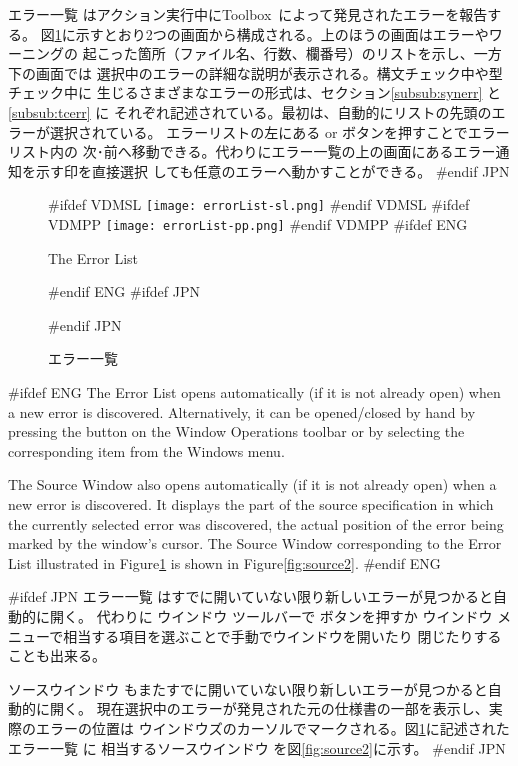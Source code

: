\documentclass[\pformat,12pt]{article}
\newcommand{\Toolbox}{Toolbox}
\newcommand{\Toolbox}{Toolbox}
\newcommand{\guicmd}[1]{{\sf #1}}
\newcommand{\guicmd}[1]{{\gt #1}}
\begin{document}
\guicmd{エラー一覧} はアクション実行中に\Toolbox\ によって発見されたエラーを報告する。
図\ref{fig:error2}に示すとおり2つの画面から構成される。上のほうの画面はエラーやワーニングの
起こった箇所（ファイル名、行数、欄番号）のリストを示し、一方下の画面では
選択中のエラーの詳細な説明が表示される。構文チェック中や型チェック中に
生じるさまざまなエラーの形式は、セクション\ref{subsub:synerr} と\ref{subsub:tcerr} に
それぞれ記述されている。最初は、自動的にリストの先頭のエラーが選択されている。
エラーリストの左にある {\fbox{\tt >}} or \fbox{{\tt <}} ボタンを押すことでエラーリスト内の
次･前へ移動できる。代わりに\guicmd{エラー一覧}の上の画面にあるエラー通知を示す印を直接選択
しても任意のエラーへ動かすことができる。
#endif JPN

\begin{figure}[tbh]
\begin{center}
#ifdef VDMSL
\texttt{[image: errorList-sl.png]}
#endif VDMSL
#ifdef VDMPP
\texttt{[image: errorList-pp.png]}
#endif VDMPP
#ifdef ENG
\caption{The Error List}
#endif ENG
#ifdef JPN
\caption{エラー一覧}
#endif JPN
\label{fig:error2}
\end{center}
\end{figure}

#ifdef ENG
The \guicmd{Error List} opens automatically (if it is not already
open) when a new error is discovered. Alternatively, it can be
opened/closed by hand by pressing the  
button on the \guicmd{Window Operations} toolbar or by
selecting the corresponding item from the \guicmd{Windows} menu.

The \guicmd{Source Window} also opens automatically (if it is not
already open) when a new error is discovered. It displays the part of 
the source specification in which the currently selected error was
discovered, the actual position of the error being marked by the
window's cursor. The \guicmd{Source Window} corresponding to the
\guicmd{Error List} illustrated in Figure\ref{fig:error2} is shown in  
Figure\ref{fig:source2}.
#endif ENG

#ifdef JPN
\guicmd{エラー一覧} はすでに開いていない限り新しいエラーが見つかると自動的に開く。
代わりに \guicmd{ウインドウ} ツールバーで 
ボタンを押すか
\guicmd{ウインドウ} メニューで相当する項目を選ぶことで手動でウインドウを開いたり
閉じたりすることも出来る。

\guicmd{ソースウインドウ} もまたすでに開いていない限り新しいエラーが見つかると自動的に開く。
現在選択中のエラーが発見された元の仕様書の一部を表示し、実際のエラーの位置は
ウインドウズのカーソルでマークされる。図\ref{fig:error2}に記述された\guicmd{エラー一覧} に
相当する\guicmd{ソースウインドウ} を図\ref{fig:source2}に示す。
#endif JPN
\end{document}
